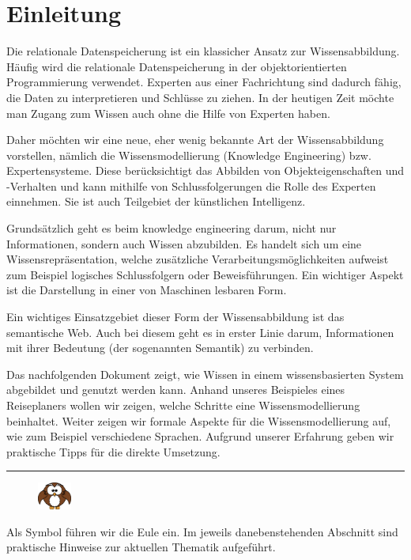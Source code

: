 \chapter{Einleitung}
\label{chap:einleitung}
Die relationale Datenspeicherung ist ein klassicher Ansatz zur Wissensabbildung. Häufig wird die relationale Datenspeicherung in der objektorientierten Programmierung verwendet. Experten aus einer Fachrichtung sind dadurch fähig, die Daten zu interpretieren und Schlüsse zu ziehen. In der heutigen Zeit möchte man Zugang zum Wissen auch ohne die Hilfe von Experten haben. 

Daher möchten wir eine neue, eher wenig bekannte Art der Wissensabbildung vorstellen, nämlich die Wissensmodellierung (Knowledge Engineering) bzw. Expertensysteme. Diese berücksichtigt das Abbilden von Objekteigenschaften und -Verhalten und kann mithilfe von Schlussfolgerungen die Rolle des Experten einnehmen. Sie ist auch Teilgebiet der künstlichen Intelligenz.

Grundsätzlich geht es beim knowledge engineering darum, nicht nur Informationen, sondern auch Wissen abzubilden. Es handelt sich um eine Wissensrepräsentation, welche zusätzliche Verarbeitungsmöglichkeiten aufweist zum Beispiel logisches Schlussfolgern oder Beweisführungen. Ein wichtiger Aspekt ist die Darstellung in einer von Maschinen lesbaren Form.~\cite{ISpekOntoGeschichte}

Ein wichtiges Einsatzgebiet dieser Form der Wissensabbildung ist das semantische Web. Auch bei diesem geht es in erster Linie darum, Informationen mit ihrer Bedeutung (der sogenannten Semantik) zu verbinden.

Das nachfolgenden Dokument zeigt, wie Wissen in einem wissensbasierten System abgebildet und genutzt werden kann. Anhand unseres Beispieles eines Reiseplaners wollen wir zeigen, welche Schritte eine Wissensmodellierung beinhaltet. Weiter zeigen wir formale Aspekte für die Wissensmodellierung auf, wie zum Beispiel verschiedene Sprachen. Aufgrund unserer Erfahrung geben wir praktische Tipps für die direkte Umsetzung.

\noindent\rule[1ex]{\textwidth}{1pt}
\begin{figure}
    \vspace{-12pt}
    \includegraphics[width=0.1\textwidth]{bilder/owl.png}
\end{figure}
Als Symbol führen wir die Eule ein. Im jeweils danebenstehenden Abschnitt sind praktische Hinweise zur aktuellen Thematik aufgeführt.

